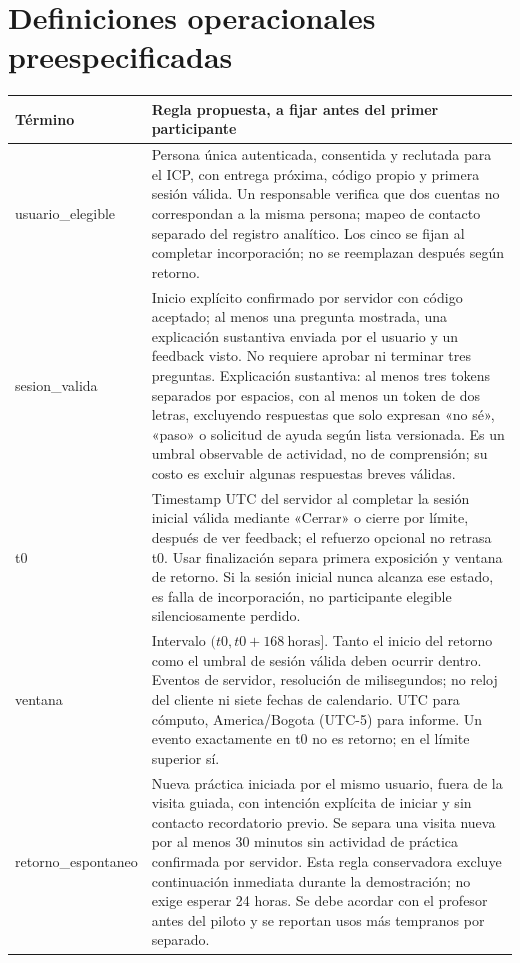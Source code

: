 \documentclass[11pt,a4paper]{report}
\begin{document}
\section{Definiciones operacionales preespecificadas}
\begin{longtable}{P{3.1cm}P{12.9cm}}
\toprule Término & Regla propuesta, a fijar antes del primer participante \\\midrule\endhead
usuario\_elegible & Persona única autenticada, consentida y reclutada para el ICP, con entrega próxima, código propio y primera sesión válida. Un responsable verifica que dos cuentas no correspondan a la misma persona; mapeo de contacto separado del registro analítico. Los cinco se fijan al completar incorporación; no se reemplazan después según retorno.\\
sesion\_valida & Inicio explícito confirmado por servidor con código aceptado; al menos una pregunta mostrada, una explicación sustantiva enviada por el usuario y un feedback visto. No requiere aprobar ni terminar tres preguntas. Explicación sustantiva: al menos tres tokens separados por espacios, con al menos un token de dos letras, excluyendo respuestas que solo expresan «no sé», «paso» o solicitud de ayuda según lista versionada. Es un umbral observable de actividad, no de comprensión; su costo es excluir algunas respuestas breves válidas.\\
t0 & Timestamp UTC del servidor al completar la sesión inicial válida mediante «Cerrar» o cierre por límite, después de ver feedback; el refuerzo opcional no retrasa t0. Usar finalización separa primera exposición y ventana de retorno. Si la sesión inicial nunca alcanza ese estado, es falla de incorporación, no participante elegible silenciosamente perdido.\\
ventana & Intervalo \((t0,t0+168\ \mathrm{horas}]\). Tanto el inicio del retorno como el umbral de sesión válida deben ocurrir dentro. Eventos de servidor, resolución de milisegundos; no reloj del cliente ni siete fechas de calendario. UTC para cómputo, America/Bogota (UTC-5) para informe. Un evento exactamente en t0 no es retorno; en el límite superior sí.\\
retorno\_espontaneo & Nueva práctica iniciada por el mismo usuario, fuera de la visita guiada, con intención explícita de iniciar y sin contacto recordatorio previo. Se separa una visita nueva por al menos 30 minutos sin actividad de práctica confirmada por servidor. Esta regla conservadora excluye continuación inmediata durante la demostración; no exige esperar 24 horas. Se debe acordar con el profesor antes del piloto y se reportan usos más tempranos por separado.\\

\end{longtable}
\end{document}
